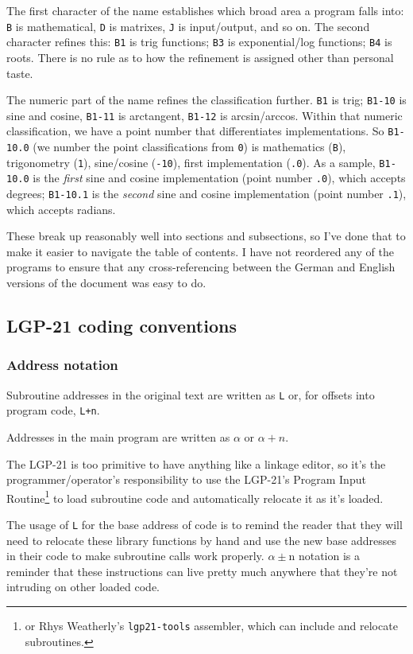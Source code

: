 The first character of the name establishes which broad area a program falls into: \texttt{B} is mathematical, \texttt{D} is matrixes, \texttt{J} is input/output, and so on. The second character refines this: \texttt{B1} is trig functions; \texttt{B3} is exponential/log functions; \texttt{B4} is roots. There is no rule as to how the refinement is assigned other than personal taste.

The numeric part of the name refines the classification further. \texttt{B1} is trig; \texttt{B1-10} is sine and cosine, \texttt{B1-11} is arctangent, \texttt{B1-12} is arcsin/arccos. Within that numeric classification, we have a point number that differentiates implementations. So \texttt{B1-10.0} (we number the point classifications from \texttt{0}) is mathematics (\texttt{B}), trigonometry (\texttt{1}), sine/cosine (\texttt{-10}), first implementation (\texttt{.0}). As a sample,
\texttt{B1-10.0} is the \emph{first} sine and cosine implementation (point number \texttt{.0}), which accepts degrees; \texttt{B1-10.1} is the \emph{second} sine and cosine implementation (point number \texttt{.1}), which accepts radians.

These break up reasonably well into sections and subsections, so I've done that to make it easier to navigate the table of contents. I have not reordered any of the programs to ensure that any cross-referencing between the German and English versions of the document was easy to do.
\subsection{LGP-21 coding conventions}
\subsubsection{Address notation}
Subroutine addresses in the original text are written as \texttt{L} or, for offsets into program code,  \texttt{L+n}. 

Addresses in the main program are written as $\alpha$ or $\alpha+n$.

The LGP-21 is too primitive to have anything like a linkage editor, so it's the programmer/operator's responsibility to use the LGP-21's Program Input Routine\footnote{or Rhys Weatherly's \texttt{lgp21-tools} assembler, which can include and relocate subroutines.} to load subroutine code and automatically relocate it as it's loaded. 

The usage of \texttt{L} for the base address of code is to remind the reader that they will need to relocate these library functions by hand and use the new base addresses
in their code to make subroutine calls work properly. $\alpha\pm$n notation is a reminder that these instructions can live pretty much anywhere that they're not intruding on other loaded code.

